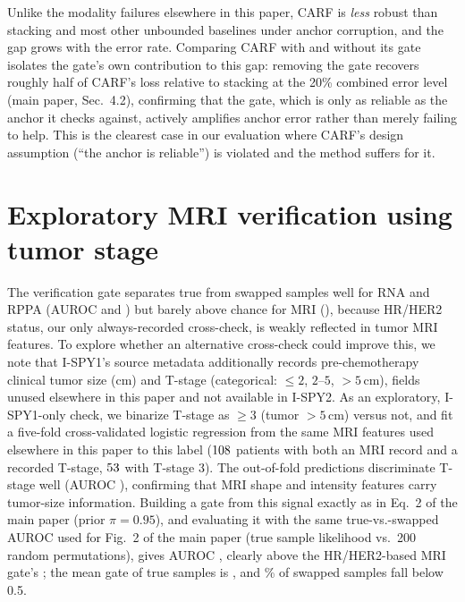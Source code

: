 \documentclass[a4paper,runningheads]{llncs}
\begin{document}
Unlike the modality failures elsewhere in this paper, CARF is \emph{less} robust than stacking and most other unbounded baselines under anchor corruption, and the gap grows with the error rate. Comparing CARF with and without its gate isolates the gate's own contribution to this gap: removing the gate recovers roughly half of CARF's loss relative to stacking at the 20\% combined error level (main paper, Sec.~4.2), confirming that the gate, which is only as reliable as the anchor it checks against, actively amplifies anchor error rather than merely failing to help. This is the clearest case in our evaluation where CARF's design assumption (``the anchor is reliable'') is violated and the method suffers for it.

\begin{table}[h]
\centering
\caption{External AUROC when the clinical anchor itself is corrupted (HR/HER2 status flipped for a random subset of patients; 30 realizations per cell). Bold: best fusion model per row.}
\label{tab:anchor-review}
\setlength{\tabcolsep}{3pt}
\end{table}

\section{Exploratory MRI verification using tumor stage}

The verification gate separates true from swapped samples well for RNA and RPPA (AUROC \GateAucRna{} and \GateAucRppa{}) but barely above chance for MRI (\GateAucMri{}), because HR/HER2 status, our only always-recorded cross-check, is weakly reflected in tumor MRI features. To explore whether an alternative cross-check could improve this, we note that I-SPY1's source metadata additionally records pre-chemotherapy clinical tumor size (cm) and T-stage (categorical: $\le2$, $2$--$5$, $>5$\,cm), fields unused elsewhere in this paper and not available in I-SPY2. As an exploratory, I-SPY1-only check, we binarize T-stage as $\ge 3$ (tumor $>5$\,cm) versus not, and fit a five-fold cross-validated logistic regression from the same MRI features used elsewhere in this paper to this label ($108{}$ patients with both an MRI record and a recorded T-stage, $53{}$ with T-stage 3). The out-of-fold predictions discriminate T-stage well (AUROC \MriTstageDirectAuc{}), confirming that MRI shape and intensity features carry tumor-size information. Building a gate from this signal exactly as in Eq.~2 of the main paper (prior $\pi=0.95$), and evaluating it with the same true-vs.-swapped AUROC used for Fig.~2 of the main paper (true sample likelihood vs.\ 200 random permutations), gives AUROC \MriTstageGateAuc{}, clearly above the HR/HER2-based MRI gate's \GateAucMri{}; the mean gate of true samples is \MriTstageGateTrueMean{}, and \MriTstageGateSwapLow\% of swapped samples fall below 0.5.
\end{document}

